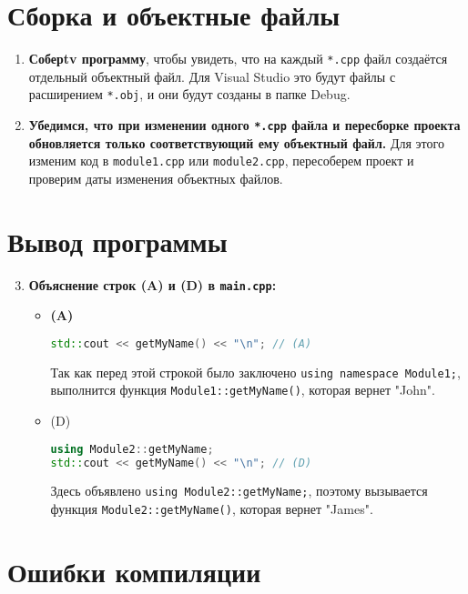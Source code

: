 \documentclass{article}
\begin{document}
\section*{Сборка и объектные файлы}

\begin{enumerate}
    \item \textbf{Соберtv программу}, чтобы увидеть, что на каждый \texttt{*.cpp} файл создаётся отдельный объектный файл. Для Visual Studio это будут файлы с расширением \texttt{*.obj}, и они будут созданы в папке Debug.

    \item \textbf{Убедимся, что при изменении одного \texttt{*.cpp} файла и пересборке проекта обновляется только соответствующий ему объектный файл.} Для этого изменим код в \texttt{module1.cpp} или \texttt{module2.cpp}, пересоберем проект и проверим даты изменения объектных файлов.
\end{enumerate}

\section*{Вывод программы}

\begin{enumerate}
    \setcounter{enumi}{2}
    \item \textbf{Объяснение строк (A) и (D) в \texttt{main.cpp}:}

    \begin{itemize}
        \item \textbf{(A)}
        \begin{lstlisting}[language=C++]
std::cout << getMyName() << "\n"; // (A)
        \end{lstlisting}
        Так как перед этой строкой было заключено \lstinline|using namespace Module1;|, выполнится функция \lstinline|Module1::getMyName()|, которая вернет "John".

        \item (D)
        \begin{lstlisting}[language=C++]
using Module2::getMyName;
std::cout << getMyName() << "\n"; // (D)
        \end{lstlisting}
        Здесь объявлено \lstinline|using Module2::getMyName;|, поэтому вызывается функция \lstinline|Module2::getMyName()|, которая вернет "James".
    \end{itemize}
\end{enumerate}

\section*{Ошибки компиляции}
\end{document}
